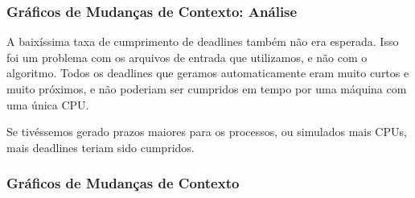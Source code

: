 \documentclass{beamer}
\begin{document}
\begin{frame}
\frametitle{Gráficos de Mudanças de Contexto: Análise}
\item A baixíssima taxa de cumprimento de deadlines também não era esperada. Isso foi um problema com os arquivos de entrada que utilizamos, e não com o algoritmo. Todos os deadlines que geramos automaticamente eram muito curtos e muito próximos, e não poderiam ser cumpridos em tempo por uma máquina com uma única CPU.

\item Se tivéssemos gerado prazos maiores para os processos, ou simulados mais CPUs, mais deadlines teriam sido cumpridos. 
\end{frame}


\begin{frame}
\frametitle{Gráficos de Mudanças de Contexto}

\blindtext


\end{frame}
\end{document}

